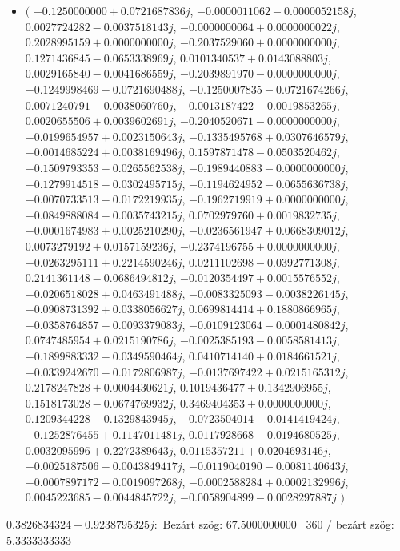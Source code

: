 \documentclass[14pt,a4paper]{article}
\begin{document}
\begin{itemize}
\item
$\big($
$-0.1250000000+0.0721687836j$, $-0.0000011062-0.0000052158j$, $0.0027724282-0.0037518143j$, $-0.0000000064+0.0000000022j$, $0.2028995159+0.0000000000j$, $-0.2037529060+0.0000000000j$, $0.1271436845-0.0653338969j$, $0.0101340537+0.0143088803j$, $0.0029165840-0.0041686559j$, $-0.2039891970-0.0000000000j$, $-0.1249998469-0.0721690488j$, $-0.1250007835-0.0721674266j$, $0.0071240791-0.0038060760j$, $-0.0013187422-0.0019853265j$, $0.0020655506+0.0039602691j$, $-0.2040520671-0.0000000000j$, $-0.0199654957+0.0023150643j$, $-0.1335495768+0.0307646579j$, $-0.0014685224+0.0038169496j$, $0.1597871478-0.0503520462j$, $-0.1509793353-0.0265562538j$, $-0.1989440883-0.0000000000j$, $-0.1279914518-0.0302495715j$, $-0.1194624952-0.0655636738j$, $-0.0070733513-0.0172219935j$, $-0.1962719919+0.0000000000j$, $-0.0849888084-0.0035743215j$, $0.0702979760+0.0019832735j$, $-0.0001674983+0.0025210290j$, $-0.0236561947+0.0668309012j$, $0.0073279192+0.0157159236j$, $-0.2374196755+0.0000000000j$, $-0.0263295111+0.2214590246j$, $0.0211102698-0.0392771308j$, $0.2141361148-0.0686494812j$, $-0.0120354497+0.0015576552j$, $-0.0206518028+0.0463491488j$, $-0.0083325093-0.0038226145j$, $-0.0908731392+0.0338056627j$, $0.0699814414+0.1880866965j$, $-0.0358764857-0.0093379083j$, $-0.0109123064-0.0001480842j$, $0.0747485954+0.0215190786j$, $-0.0025385193-0.0058581413j$, $-0.1899883332-0.0349590464j$, $0.0410714140+0.0184661521j$, $-0.0339242670-0.0172806987j$, $-0.0137697422+0.0215165312j$, $0.2178247828+0.0004430621j$, $0.1019436477+0.1342906955j$, $0.1518173028-0.0674769932j$, $0.3469404353+0.0000000000j$, $0.1209344228-0.1329843945j$, $-0.0723504014-0.0141419424j$, $-0.1252876455+0.1147011481j$, $0.0117928668-0.0194680525j$, $0.0032095996+0.2272389643j$, $0.0115357211+0.0204693146j$, $-0.0025187506-0.0043849417j$, $-0.0119040190-0.0081140643j$, $-0.0007897172-0.0019097268j$, $-0.0002588284+0.0002132996j$, $0.0045223685-0.0044845722j$, $-0.0058904899-0.0028297887j$
$\big)$
\end{itemize}
$0.3826834324+0.9238795325j$:\
Bezárt szög: $67.5000000000$ \
360 / bezárt szög: $5.3333333333$\
\end{document}
